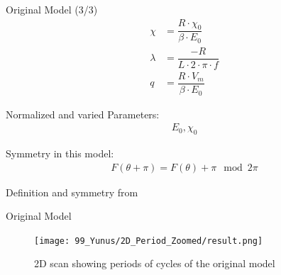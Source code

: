 \begin{frame}{Original Model (3/3)}
    \vspace{-3.0em}
    \begin{align}
        \chi    & = \dfrac{R \cdot \chi_0}{\beta \cdot E_0} \\
        \lambda & = \dfrac{-R}{L \cdot 2 \cdot \pi \cdot f} \\
        q       & = \dfrac{R \cdot V_m}{\beta \cdot E_0}
    \end{align}

    Normalized and varied Parameters:
    \begin{align*}
        E_0, \chi_0
    \end{align*}

    Symmetry in this model:
    \begin{align}
        F(\theta + \pi) = F(\theta) + \pi \mod 2 \pi
    \end{align}

    \begin{flushright}
        Definition and symmetry from \cite{akyuz2022}
    \end{flushright}
\end{frame}

\begin{frame}{Original Model}
    \begin{figure}
        \centering
        \texttt{[image: 99\_Yunus/2D\_Period\_Zoomed/result.png]}
        \caption*{2D scan showing periods of cycles of the original model}
    \end{figure}
\end{frame}

